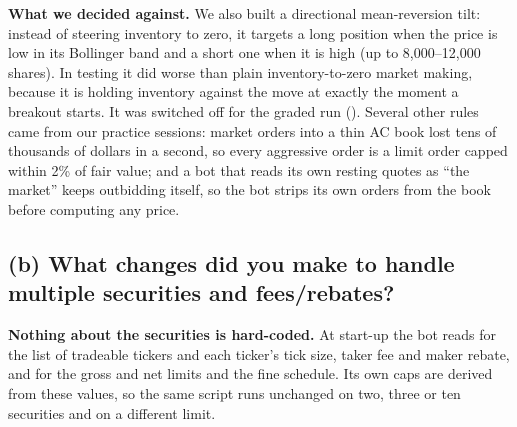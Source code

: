\textbf{What we decided against.} We also built a directional mean-reversion tilt: instead of steering inventory to zero, it targets a long position when the price is low in
its Bollinger band and a short one when it is high (up to 8{,}000--12{,}000 shares). In testing it did worse than plain inventory-to-zero market making, because it is holding
inventory against the move at exactly the moment a breakout starts. It was switched off for the graded run (). Several other rules came from our practice
sessions: market orders into a thin AC book lost tens of thousands of dollars in a second, so every aggressive order is a limit order capped within 2\% of fair value; and a
bot that reads its own resting quotes as ``the market'' keeps outbidding itself, so the bot strips its own orders from the book before computing any price.

\subsection*{(b) What changes did you make to handle multiple securities and fees/rebates?}

\textbf{Nothing about the securities is hard-coded.} At start-up the bot reads  for the list of tradeable tickers and each ticker's tick size, taker fee
and maker rebate, and  for the gross and net limits and the fine schedule. Its own caps are derived from these values, so the same script runs unchanged on
two, three or ten securities and on a different limit.


